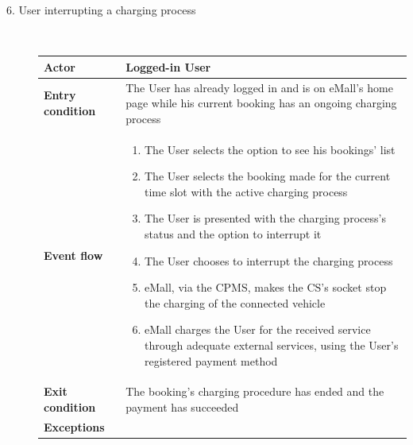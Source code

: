 \documentclass[11pt]{article}
\begin{document}
\begin{description}
    \item [6. User interrupting a charging process] \hfill \\
    \begin{table}[H]
        \centering
        \setlength{\tabcolsep}{18pt}
        \renewcommand{\arraystretch}{1.4}
        \begin{tabularx}{\textwidth}{|>{\hsize=0.5\hsize}X|>{\hsize=1.5\hsize}X|}
            \hline
            \textbf{Actor} & Logged-in User \\
            \hline
            \textbf{Entry condition} & The User has already logged in and is on eMall's home page while his current booking has an ongoing charging process \\
            \hline
            \textbf{Event flow} & 
                \begin{minipage}[t]{\hsize}
                \begin{enumerate}[topsep=0pt, leftmargin=*]
                    \item The User selects the option to see his bookings' list
                    \item The User selects the booking made for the current time slot with the active charging process
                    \item The User is presented with the charging process's status and the option to interrupt it
                    \item The User chooses to interrupt the charging process
                    \item eMall, via the CPMS, makes the CS's socket stop the charging of the connected vehicle
                    \item eMall charges the User for the received service through adequate external services, using the User’s registered payment method
                \end{enumerate}
                \end{minipage}
                \vspace{6pt}
            \\
            \hline
            \textbf{Exit condition} & The booking's charging procedure has ended and the payment has succeeded \\
            \hline
            \textbf{Exceptions} & 
                \begin{minipage}[t]{\hsize}
                \vspace{0pt}

\end{minipage}
\end{tabularx}
\end{table}
\end{description}
\end{document}
